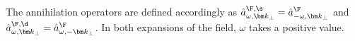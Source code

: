 \documentclass[aps,prd,preprintnumbers,nofootinbib,showpacs]{revtex4}%
\begin{document}
\begin{widetext}
The annihilation operators are defined accordingly as 
${\hat a}_{\omega,{\bm k}_\perp}^{\F,\s}={\hat a}_{-\omega,{\bm k}_\perp}^{\F}$
and 
${\hat a}_{\omega,{\bm k}_\perp}^{\F,\d}={\hat a}_{\omega,-{\bm k}_\perp}^{\F}$.
In both expansions of the field, $\omega$ takes a positive value. 


\end{widetext}
\end{document}
